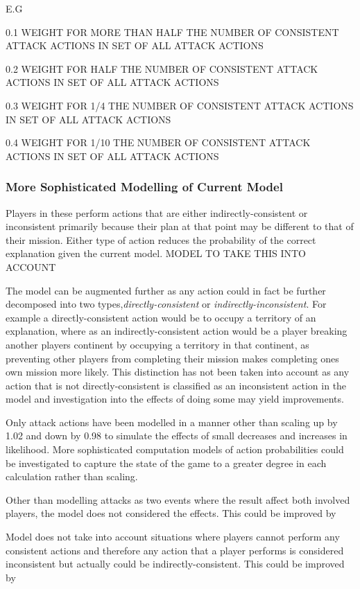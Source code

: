 \documentclass[parskip]{cs4rep}
\begin{document}
E.G 

0.1 WEIGHT FOR MORE THAN HALF THE NUMBER OF CONSISTENT ATTACK ACTIONS IN SET OF ALL ATTACK ACTIONS

0.2 WEIGHT FOR HALF THE NUMBER OF CONSISTENT ATTACK ACTIONS IN SET OF ALL ATTACK ACTIONS

0.3 WEIGHT FOR 1/4 THE NUMBER OF CONSISTENT ATTACK ACTIONS IN SET OF ALL ATTACK ACTIONS

0.4 WEIGHT FOR 1/10 THE NUMBER OF CONSISTENT ATTACK ACTIONS IN SET OF ALL ATTACK ACTIONS

\subsubsection{More Sophisticated Modelling of Current Model}

Players in these perform actions that are either indirectly-consistent or inconsistent  primarily because their plan at that point may be different to that of their mission. Either type of action reduces the probability of the correct explanation given the current model. MODEL TO TAKE THIS INTO ACCOUNT

The model can be augmented further as any action could in fact be further decomposed into two types,\textit{directly-consistent} or \textit{indirectly-inconsistent}. For example a directly-consistent action would be to occupy a territory of an explanation, where as an indirectly-consistent action would be a player breaking another players continent by occupying a territory in that continent, as preventing other players from completing their mission makes completing ones own mission more likely. This distinction has not been taken into account as any action that is not directly-consistent is classified as an inconsistent action in the model and investigation into the effects of doing some may yield improvements.

Only attack actions have been modelled in a manner other than scaling up by 1.02 and down by 0.98 to simulate the effects of small decreases and increases in likelihood. More sophisticated computation models of action probabilities could be investigated to capture the state of the game to a greater degree in each calculation rather than scaling.

Other than modelling attacks as two events where the result affect both involved players, the model does not considered the effects. This could be improved by

Model does not take into account situations where players cannot perform any consistent actions and therefore any action that a player performs is considered inconsistent but actually could be indirectly-consistent. This could be improved by
\end{document}
